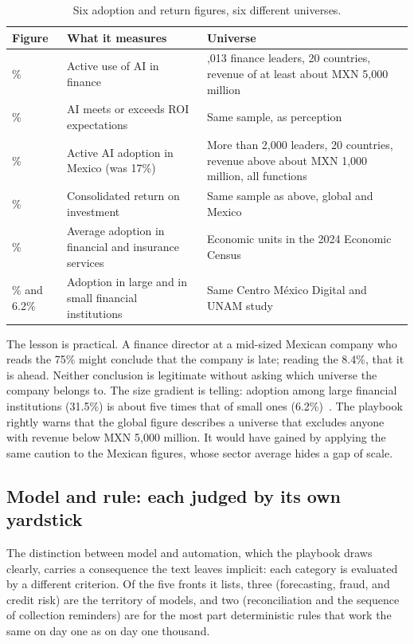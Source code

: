 \documentclass[11pt,a4paper]{article}
\begin{document}
\begin{table}[h]
\centering
\small
\begin{tabular}{@{}>{\raggedright\arraybackslash}p{1.9cm}>{\raggedright\arraybackslash}p{4.9cm}>{\raggedright\arraybackslash}p{7.1cm}@{}}
\toprule
Figure & What it measures & Universe \\
\midrule
75\% & Active use of AI in finance & 1,013 finance leaders, 20 countries, revenue of at least about MXN 5,000 million~\cite{kpmgfin} \\
71\% & AI meets or exceeds ROI expectations & Same sample, as perception~\cite{kpmgfin} \\
26\% & Active AI adoption in Mexico (was 17\%) & More than 2,000 leaders, 20 countries, revenue above about MXN 1,000 million, all functions~\cite{kpmgpulse} \\
7\% & Consolidated return on investment & Same sample as above, global and Mexico~\cite{kpmgpulse} \\
8.4\% & Average adoption in financial and insurance services & Economic units in the 2024 Economic Census~\cite{cmd} \\
31.5\% and 6.2\% & Adoption in large and in small financial institutions & Same Centro M\'exico Digital and UNAM study~\cite{cmd} \\
\bottomrule
\end{tabular}
\caption{Six adoption and return figures, six different universes.}
\label{tab:universes}
\end{table}

The lesson is practical. A finance director at a mid-sized Mexican company who reads the 75\% might conclude that the company is late; reading the 8.4\%, that it is ahead. Neither conclusion is legitimate without asking which universe the company belongs to. The size gradient is telling: adoption among large financial institutions (31.5\%) is about five times that of small ones (6.2\%)~\cite{cmd}. The playbook rightly warns that the global figure describes a universe that excludes anyone with revenue below MXN 5,000 million. It would have gained by applying the same caution to the Mexican figures, whose sector average hides a gap of scale.

\subsection{Model and rule: each judged by its own yardstick}

The distinction between model and automation, which the playbook draws clearly, carries a consequence the text leaves implicit: each category is evaluated by a different criterion. Of the five fronts it lists, three (forecasting, fraud, and credit risk) are the territory of models, and two (reconciliation and the sequence of collection reminders) are for the most part deterministic rules that work the same on day one as on day one thousand.
\end{document}
